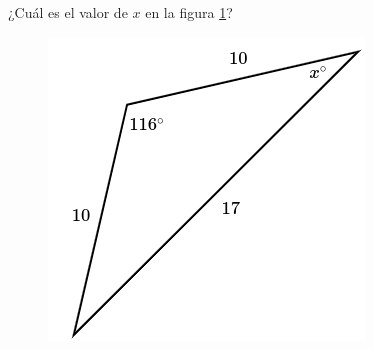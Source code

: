 ¿Cuál es el valor de $x$ en la figura \ref{fig:findangle14}?

\begin{minipage}[t][][t]{0.35\textwidth}
    \begin{figure}[H]
        \centering
        \includegraphics[width=0.9\linewidth]{../images/findangle14.png}
        \caption{}
        \label{fig:findangle14}
    \end{figure}
\end{minipage}\hfill
